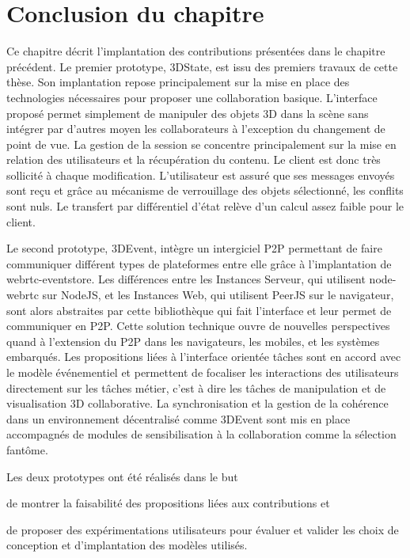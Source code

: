 \section{Conclusion du chapitre}

Ce chapitre décrit l'implantation des contributions présentées dans le chapitre 
précédent.
Le premier prototype, 3DState, est issu des premiers travaux de cette thèse. Son 
implantation repose principalement sur la mise en place des technologies 
nécessaires pour proposer une collaboration basique. L'interface proposé permet 
simplement de manipuler des objets 3D dans la scène sans intégrer par d'autres 
moyen les collaborateurs à l'exception du changement de point de vue. La gestion 
de la session se concentre principalement sur la mise en relation des utilisateurs 
et la récupération du contenu. Le client est donc très sollicité à chaque 
modification. L'utilisateur est assuré que ses messages envoyés sont reçu et 
grâce au mécanisme de verrouillage des objets sélectionné, les conflits sont nuls. 
Le transfert par différentiel d'état relève d'un calcul assez faible pour le client.

Le second prototype, 3DEvent, intègre un intergiciel \gls{P2P} permettant de faire 
communiquer différent types de plateformes entre elle grâce à l'implantation de 
webrtc-eventstore. Les différences entre les Instances Serveur, qui utilisent  
node-webrtc sur NodeJS, et les Instances Web, qui utilisent PeerJS sur le 
navigateur, sont alors abstraites par cette bibliothèque qui fait l'interface et leur 
permet de communiquer en \gls{P2P}. Cette solution technique ouvre de nouvelles 
perspectives quand à l'extension du \gls{P2P} dans les navigateurs, les mobiles, 
et les systèmes embarqués. Les propositions liées à l'interface orientée tâches 
sont en accord avec le modèle événementiel et permettent de focaliser les 
interactions des utilisateurs directement sur les tâches métier, c'est à dire les 
tâches de manipulation et de visualisation 3D collaborative. La synchronisation et 
la gestion de la cohérence dans un environnement décentralisé comme 3DEvent 
sont mis en place accompagnés de modules de sensibilisation à la collaboration 
comme la sélection fantôme.

Les deux prototypes ont été réalisés dans le but 
\begin{enumerate*}[label=(\roman*)]
	\item de montrer la faisabilité des 
	propositions liées aux contributions et
	\item de proposer des expérimentations 
	utilisateurs pour évaluer et valider les choix de conception et d'implantation des 
	modèles utilisés.
\end{enumerate*}
%
